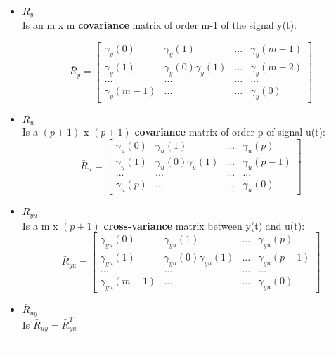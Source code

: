 \begin{itemize}
\item $\bar{R}_y$\\
Is an m x m \textbf{covariance} matrix of order m-1 of the signal y(t):

$$
\bar{R}_y = 
	\begin{bmatrix}
       \gamma_{y}(0) & \gamma_y(1) & ... & \gamma_y(m-1)        \\[0.3em]
       \gamma_y(1) & \gamma_y(0)\gamma_y(1) &...& \gamma_y(m-2) \\[0.3em]
       ... & ... & ... 	& ...								   \\[0.3em]
       \gamma_y(m-1) & ... & ... & \gamma_y(0)
     \end{bmatrix} 
$$

\item $\bar{R}_{u}$\\
Is a $(p+1)$ x $(p+1)$ \textbf{covariance } matrix of order p of signal u(t):
$$
\bar{R}_{u} = 
	\begin{bmatrix}
       \gamma_{u}(0) & \gamma_{u}(1) & ... & \gamma_{u}(p)        \\[0.3em]
       \gamma_{u}(1) & \gamma_{u}(0)\gamma_{u}(1) &...& \gamma_{u}(p-1) \\[0.3em]
       ... & ... & ... 	& ...								   \\[0.3em]
       \gamma_{u}(p) & ... & ... & \gamma_{u}(0)
     \end{bmatrix} 
$$

\item $\bar{R}_{yu}$\\
Is a m x $(p+1)$ \textbf{cross-variance} matrix between y(t) and u(t):
$$
\bar{R}_{yu} = 
	\begin{bmatrix}
       \gamma_{yu}(0) & \gamma_{yu}(1) & ... & \gamma_{yu}(p)        \\[0.3em]
       \gamma_{yu}(1) & \gamma_{yu}(0)\gamma_{yu}(1) &...& \gamma_{yu}(p-1) \\[0.3em]
       ... & ... & ... 	& ...								   \\[0.3em]
       \gamma_{yu}(m-1) & ... & ... & \gamma_{yu}(0)
     \end{bmatrix} 
$$
\item $\bar{R}_{u y}$\\
Is $\bar{R}_{u y} = \bar{R}_{yu}^T$
\end{itemize}
---------------------------------------------------------------------------------------------------

